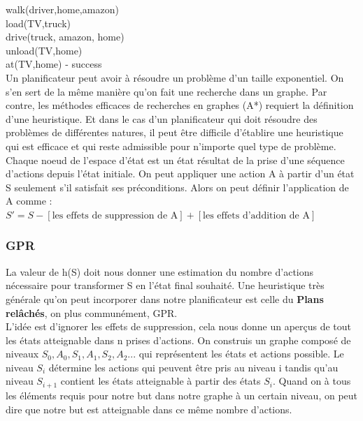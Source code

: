 \documentclass[oneside]{book}
\begin{document}
walk(driver,home,amazon)\\
load(TV,truck)\\
drive(truck, amazon, home)\\
unload(TV,home)\\
at(TV,home) - success\\


Un planificateur peut avoir à résoudre un problème d'un taille exponentiel. On s'en sert de la même manière qu'on fait une recherche dans un graphe. Par contre, les méthodes efficaces de recherches en graphes (A*) requiert la définition d'une heuristique. Et dans le cas d'un planificateur qui doit résoudre des problèmes de différentes natures, il peut être difficile d'établire une heuristique qui est efficace et qui reste admissible pour n'importe quel type de problème.\\

Chaque noeud de l'espace d'état est un état résultat de la prise d'une séquence d'actions  depuis l'état initiale. On peut appliquer une action A à partir d'un état S seulement s'il satisfait ses préconditions. Alors on peut définir l'application de A comme : \\

$S' = S - [\text{les effets de suppression de A}] + [\text{les effets d'addition de A}]$\\

\subsubsection{GPR}
La valeur de h(S) doit nous donner une estimation du nombre d'actions nécessaire pour transformer S en l'état final souhaité. Une heuristique très générale qu'on peut incorporer dans notre planificateur est celle du \textbf{Plans relâchés}, on plus communément, GPR.\\

L'idée est d'ignorer les effets de suppression, cela nous donne un aperçus de tout les états atteignable dans n prises d'actions. On construis un graphe composé de niveaux $S_0, A_0, S_1, A_1, S_2,A_2...$ qui représentent les états et actions possible. Le niveau $S_i$ détermine les actions qui peuvent être pris au niveau i tandis qu'au niveau $S_{i+1}$ contient les états atteignable à partir des états $S_i$. Quand on à tous les éléments requis pour notre but dans notre graphe à un certain niveau, on peut dire que notre but est atteignable dans ce même nombre d'actions.\\
\end{document}
